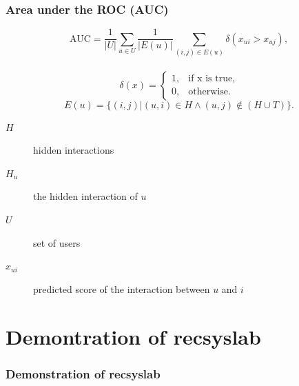 \documentclass[mathserif,svgnames]{beamer}
\begin{document}
\begin{frame} 
    \frametitle{Area under the ROC (AUC)~\cite{Rendle:2009:BBP:1795114.1795167}}
\begin{equation} 
\text{AUC}=\frac{1}{|U|}\sum_{u \in U} \frac{1}{|E(u)|} 
\sum_{(i,j) \in E(u)} \delta(x_{ui}>x_{uj}),
\end{equation}\\
\begin{equation}
\delta(x)=\begin{cases}1, & \text{if x is true}, \\
                       0, & \text{otherwise.}
\end{cases}
\end{equation}
\begin{equation}
E(u) =\{(i,j)|(u,i) \in H \land (u,j) \not\in (H \cup T)\}.
\end{equation}
\begin{description}
    \item[$H$] hidden interactions\\
    \item[$H_u$] the hidden interaction of $u$\\
    \item[$U$] set of users
    \item[$x_{ui}$] predicted score of the interaction between $u$ and $i$
\end{description}
\end{frame}

\section{Demontration of recsyslab}
\begin{frame} 
\frametitle{Demonstration of recsyslab} 
\end{frame}
\end{document}

